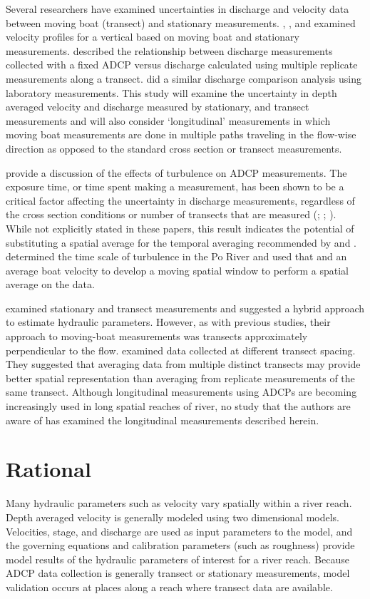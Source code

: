 \documentclass[Journal,letterpaper,BackFigs]{ascelike-new}
\begin{document}
Several researchers have examined uncertainties in discharge and velocity data between moving boat (transect) and stationary measurements. , , and  examined velocity profiles for a vertical based on moving boat and stationary measurements.  described the relationship between discharge measurements collected with a fixed ADCP versus discharge calculated using multiple replicate measurements along a transect.  did a similar discharge comparison analysis using laboratory measurements. This study will examine the uncertainty in depth averaged velocity and discharge measured by stationary, and transect measurements and will also consider ‘longitudinal’ measurements in which moving boat measurements are done in multiple paths traveling in the flow-wise direction as opposed to the standard cross section or transect measurements. 

 provide a discussion of the effects of turbulence on ADCP measurements. The exposure time, or time spent making a measurement, has been shown to be a critical factor affecting the uncertainty in discharge measurements, regardless of the cross section conditions or number of transects that are measured (; ; ). While not explicitly stated in these papers, this result indicates the potential of substituting a spatial average for the temporal averaging recommended by  and .  determined the time scale of turbulence in the Po River and used that and an average boat velocity to develop a moving spatial window to perform a spatial average on the data.

 examined stationary and transect measurements and suggested a hybrid approach to estimate hydraulic parameters. However, as with previous studies, their approach to moving-boat measurements was transects approximately perpendicular to the flow.  examined data collected at different transect spacing. They suggested that averaging data from multiple distinct transects may provide better spatial representation than averaging from replicate measurements of the same transect. Although longitudinal measurements using ADCPs are becoming increasingly used in long spatial reaches of river, no study that the authors are aware of has examined the longitudinal measurements described herein.

\section{Rational}
Many hydraulic parameters such as velocity vary spatially within a river reach. Depth averaged velocity is generally modeled using two dimensional models. Velocities, stage, and discharge are used as input parameters to the model, and the governing equations and calibration parameters (such as roughness) provide model results of the hydraulic parameters of interest for a river reach. Because ADCP data collection is generally transect or stationary measurements, model validation occurs at places along a reach where transect data are available. 
\end{document}

